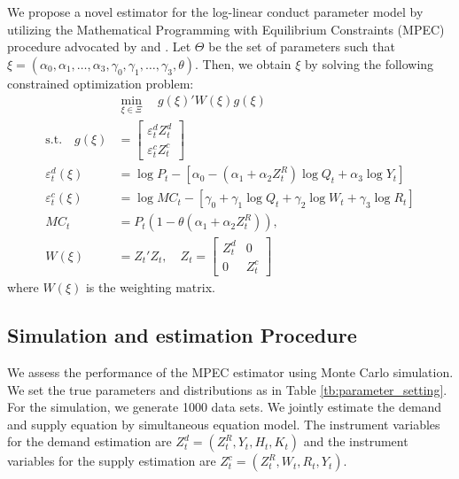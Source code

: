 \documentclass[11pt, a4paper]{article}
\begin{document}
We propose a novel estimator for the log-linear conduct parameter model by utilizing the Mathematical Programming with Equilibrium Constraints (MPEC) procedure advocated by \cite{su2012constrained} and \cite{dube2012improving}. Let $\Theta$ be the set of parameters such that $\xi = (\alpha_0,\alpha_1, \ldots, \alpha_3, \gamma_0,\gamma_1, \ldots, \gamma_3, \theta)$. Then, we obtain $\xi$ by solving the following constrained optimization problem:
\begin{align}
    &\min_{\xi \in \Xi}\quad g(\xi)' W(\xi) g(\xi) \\
    \text{s.t.}\quad g(\xi)&=\left[\begin{array}{l}
\varepsilon^{d}_{t}Z_{t}^{d} \\
\varepsilon^{c}_{t}Z_{t}^{c}
\end{array}\right]\\
    \varepsilon^{d}_{t}(\xi)&=\log P_{t} -[\alpha_0 - (\alpha_1 + \alpha_2 Z^{R}_{t}) \log Q_t + \alpha_3 \log Y_t] \\
    \varepsilon^{c}_{t} (\xi)&= \log MC_t -[\gamma_0 + \gamma_1 \log Q_t +  \gamma_2 \log W_{t} + \gamma_3 \log R_t]\\
    MC_t &= P_t(1 - \theta (\alpha_1 + \alpha_2 Z^{R}_{t})),\\
    W(\xi)&=Z_{t}'Z_{t}, \quad Z_{t}=\left[\begin{array}{ll}
Z_{t}^{d} & 0 \\
0 & Z_{t}^{c}
\end{array}\right]
\end{align}
where $W(\xi)$ is the weighting matrix. 



\subsection{Simulation and estimation Procedure}

We assess the performance of the MPEC estimator using Monte Carlo simulation.
We set the true parameters and distributions as in Table \ref{tb:parameter_setting}. 
For the simulation, we generate 1000 data sets. We jointly estimate the demand and supply equation by simultaneous equation model.
The instrument variables for the demand estimation are $Z^{d}_{t} = (Z^{R}_{t}, Y_t, H_{t}, K_{t})$ and the instrument variables for the supply estimation are $Z^{c}_{t} = (Z^{R}_{t}, W_{t}, R_t, Y_t)$. 
\end{document}
